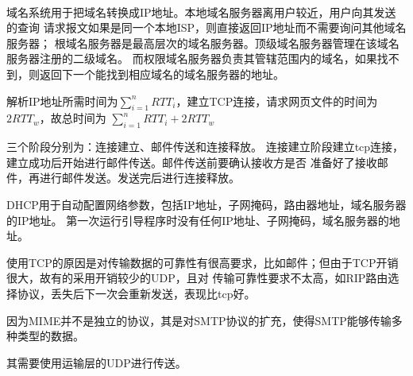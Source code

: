 \documentclass{ctexart}
\newcounter{answercnt}
\newcommand{\sCourse}{计算机网络}   %
\newcommand{\nTime}{6}             %
\newcommand{\sName}{黄昊}           %
\newcommand{\sNumber}{20204205}     %
\begin{document}
    \setcounter{answercnt}{0}
    \begin{center}
        \\
        \fontsize{13pt}{0}{\textit{\kaishu\sName\qquad\sNumber}}
    \end{center}

    \answer[6-02]
域名系统用于把域名转换成IP地址。本地域名服务器离用户较近，用户向其发送的查询
请求报文如果是同一个本地ISP，则直接返回IP地址而不需要询问其他域名服务器；
根域名服务器是最高层次的域名服务器。顶级域名服务器管理在该域名服务器注册的二级域名。
而权限域名服务器负责其管辖范围内的域名，如果找不到，则返回下一个能找到相应域名的域名服务器的地址。




    \answer[6-15]
解析IP地址所需时间为$\sum_{i=1}^nRTT_i$，建立TCP连接，请求网页文件的时间为$2RTT_w$，故总时间为
$\sum_{i=1}^nRTT_i+2RTT_w$




    \answer[6-23]
三个阶段分别为：连接建立、邮件传送和连接释放。
连接建立阶段建立tcp连接，建立成功后开始进行邮件传送。邮件传送前要确认接收方是否
准备好了接收邮件，再进行邮件发送。发送完后进行连接释放。




    \answer[6-32]
DHCP用于自动配置网络参数，包括IP地址，子网掩码，路由器地址，域名服务器的IP地址。
第一次运行引导程序时没有任何IP地址、子网掩码，域名服务器的地址。




    \answer[6-46]
    \subanswer[(1)]
使用TCP的原因是对传输数据的可靠性有很高要求，比如邮件；但由于TCP开销很大，故有的采用开销较少的UDP，且对
传输可靠性要求不太高，如RIP路由选择协议，丢失后下一次会重新发送，表现比tcp好。
    
    \subanswer[(2)]
    因为MIME并不是独立的协议，其是对SMTP协议的扩充，使得SMTP能够传输多种类型的数据。
    
    \subanswer[(3)]
其需要使用运输层的UDP进行传送。
\end{document}

